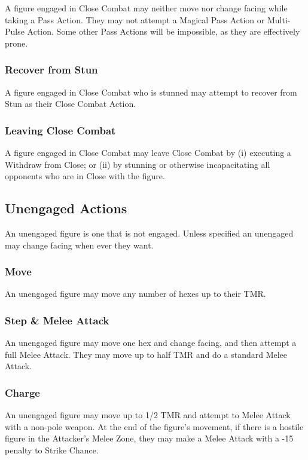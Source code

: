 \begin{multicols*}{3}
A figure engaged in Close Combat may neither move nor change facing
while taking a Pass Action. They may not attempt a Magical Pass Action
or Multi-Pulse Action. Some other Pass Actions will be impossible, as
they are effectively prone.

\subsubsection{Recover from Stun}

A figure engaged in Close Combat who is stunned may attempt to recover
from Stun as their Close Combat Action.

\subsubsection{Leaving Close Combat}

A figure engaged in Close Combat may leave Close Combat by (i)
executing a Withdraw from Close; or (ii) by stunning or otherwise
incapacitating all opponents who are in Close with the figure.

\subsection{Unengaged Actions}
\label{combat:unengaged}

An unengaged figure is one that is not engaged.  Unless specified
an unengaged may change facing when ever they want.

\subsubsection{Move}

An unengaged figure may move any number of hexes up to their
TMR.

\subsubsection{Step \& Melee Attack}

An unengaged figure may move one hex and change facing, and then
attempt a full Melee Attack.  They may move up to half TMR and do a
standard Melee Attack.

\subsubsection{Charge}

An unengaged figure may move up to 1/2 TMR and attempt to Melee Attack
with a non-pole weapon. At the end of the figure's movement, if there
is a hostile figure in the Attacker's Melee Zone, they may make a
Melee Attack with a -15 penalty to Strike Chance.


\end{multicols*}

